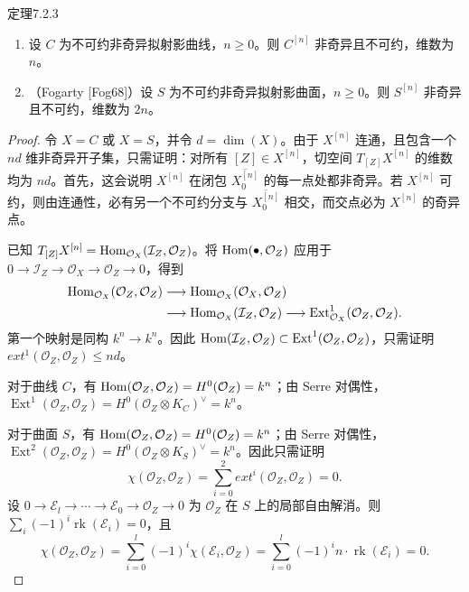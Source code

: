 \begin{origstatement}{定理}{7.2.3}\label{ch07:7.2.3}
\begin{enumerate}[label=(\arabic*)]
\item 设 $C$ 为不可约非奇异拟射影曲线，$n\geq0$。则 $C^{[n]}$ 非奇异且不可约，维数为 $n$。
\item （Fogarty [Fog68]）设 $S$ 为不可约非奇异拟射影曲面，$n\geq0$。则 $S^{[n]}$ 非奇异且不可约，维数为 $2n$。
\end{enumerate}
\end{origstatement}
\begin{proof}
令 $X=C$ 或 $X=S$，并令 $d=\dim(X)$。由于 $X^{[n]}$ 连通，且包含一个 $nd$ 维非奇异开子集，只需证明：对所有 $[Z]\in X^{[n]}$，切空间 $T_{[Z]}X^{[n]}$ 的维数均为 $nd$。首先，这会说明 $X^{[n]}$ 在闭包 $\overline{X_0^{[n]}}$ 的每一点处都非奇异。若 $X^{[n]}$ 可约，则由连通性，必有另一个不可约分支与 $\overline{X_0^{[n]}}$ 相交，而交点必为 $X^{[n]}$ 的奇异点。

已知 $T_{[Z]}X^{[n]}=\operatorname{Hom}_{\mathcal O_X}(\mathcal I_Z,\mathcal O_Z)$。将 $\operatorname{Hom}(\mathord\bullet,\mathcal O_Z)$ 应用于 $0\to\mathcal I_Z\to\mathcal O_X\to\mathcal O_Z\to0$，得到
\[
\begin{aligned}
\operatorname{Hom}_{\mathcal O_X}(\mathcal O_Z,\mathcal O_Z)&\longrightarrow
\operatorname{Hom}_{\mathcal O_X}(\mathcal O_X,\mathcal O_Z)\\
&\longrightarrow\operatorname{Hom}_{\mathcal O_X}(\mathcal I_Z,\mathcal O_Z)
\longrightarrow\operatorname{Ext}^1_{\mathcal O_X}(\mathcal O_Z,\mathcal O_Z).
\end{aligned}
\]
第一个映射是同构 $k^n\to k^n$。因此 $\operatorname{Hom}(\mathcal I_Z,\mathcal O_Z)\subset\operatorname{Ext}^1(\mathcal O_Z,\mathcal O_Z)$，只需证明 $ext^1(\mathcal O_Z,\mathcal O_Z)\leq nd$。

对于曲线 $C$，有 $\operatorname{Hom}(\mathcal O_Z,\mathcal O_Z)=H^0(\mathcal O_Z)=k^n$；由 Serre 对偶性，$\operatorname{Ext}^1(\mathcal O_Z,\mathcal O_Z)=H^0(\mathcal O_Z\otimes K_C)^\vee=k^n$。

对于曲面 $S$，有 $\operatorname{Hom}(\mathcal O_Z,\mathcal O_Z)=H^0(\mathcal O_Z)=k^n$；由 Serre 对偶性，$\operatorname{Ext}^2(\mathcal O_Z,\mathcal O_Z)=H^0(\mathcal O_Z\otimes K_S)^\vee=k^n$。因此只需证明
\[
\chi(\mathcal O_Z,\mathcal O_Z)=\sum_{i=0}^2 ext^i(\mathcal O_Z,\mathcal O_Z)=0.
\]
设 $0\to\mathcal E_l\to\cdots\to\mathcal E_0\to\mathcal O_Z\to0$ 为 $\mathcal O_Z$ 在 $S$ 上的局部自由解消。则 $\sum_i(-1)^i\operatorname{rk}(\mathcal E_i)=0$，且
\[
\chi(\mathcal O_Z,\mathcal O_Z)
=\sum_{i=0}^l(-1)^i\chi(\mathcal E_i,\mathcal O_Z)
=\sum_{i=0}^l(-1)^i n\cdot\operatorname{rk}(\mathcal E_i)=0.
\]
\end{proof}

